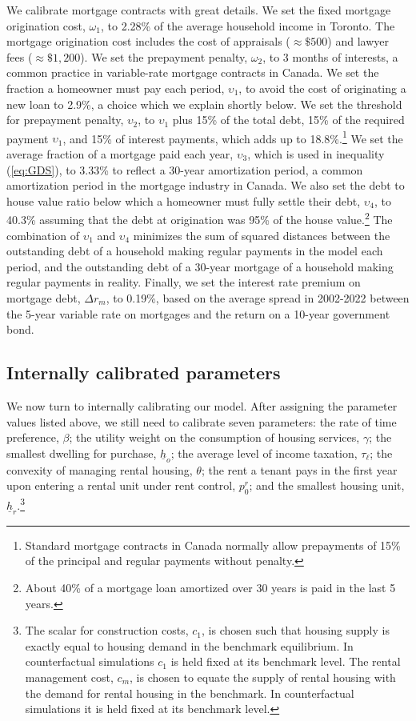 \documentclass[parskip=full]{article}
\begin{document}
We calibrate mortgage contracts with great details. We set the fixed mortgage origination cost, $\omega_{1}$, to 2.28\% of the average household income in Toronto. The mortgage origination cost includes the cost of appraisals ($\approx \$500$) and lawyer fees ($\approx \$1,200$). We set the prepayment penalty, $\omega_{2}$, to 3 months of interests, a common practice in variable-rate mortgage contracts in Canada. We set the fraction a homeowner must pay each period, $\upsilon_{1}$, to avoid the cost of originating a new loan to 2.9\%, a choice which we explain shortly below. We set the threshold for prepayment penalty, $\upsilon_{2}$, to $\upsilon_{1}$ plus 15\% of the total debt, 15\% of the required payment $\upsilon_{1}$, and 15\% of interest payments, which adds up to 18.8\%.\footnote{Standard mortgage contracts in Canada normally allow prepayments of 15\% of the principal and regular payments without penalty.} We set the average fraction of a mortgage paid each year, $\upsilon_{3}$, which is used in inequality (\ref{eq:GDS}), to 3.33\% to reflect a 30-year amortization period, a common amortization period in the mortgage industry in Canada. We also set the debt to house value ratio below which a homeowner must fully settle their debt, $\upsilon_{4}$, to 40.3\% assuming that the debt at origination was 95\% of the house value.\footnote{About 40\% of a mortgage loan amortized over 30 years is paid in the last 5 years.} The combination of $\upsilon_{1}$ and $\upsilon_{4}$ minimizes the sum of squared distances between the outstanding debt of a household making regular payments in the model each period, and the outstanding debt of a 30-year mortgage of a household making regular payments in reality. Finally, we set the interest rate premium on mortgage debt, $\Delta r_{m}$, to 0.19\%, based on the average spread in 2002-2022 between the 5-year variable rate on mortgages and the return on a 10-year government bond.

\subsection{Internally calibrated parameters}

We now turn to internally calibrating our model. After assigning the parameter values listed above, we still need to calibrate seven parameters: the rate of time preference, $\beta$; the utility weight on the consumption of housing services, $\gamma$; the smallest dwelling for purchase, $\underline{h}_{o}$; the average level of income taxation, $\tau_{\ell}$; the convexity of managing rental housing, $\theta$; the rent a tenant pays in the first year upon entering a rental unit under rent control, $p^{r}_{0}$; and the smallest housing unit, $\underline{h}_{r}$.\footnote{The scalar for construction costs, $c_{1}$, is chosen such that housing supply is exactly equal to housing demand in the benchmark equilibrium. In counterfactual simulations $c_{1}$ is held fixed at its benchmark level. The rental management cost, $c_{m}$, is chosen to equate the supply of rental housing with the demand for rental housing in the benchmark. In counterfactual simulations it is held fixed at its benchmark level.}
\end{document}
